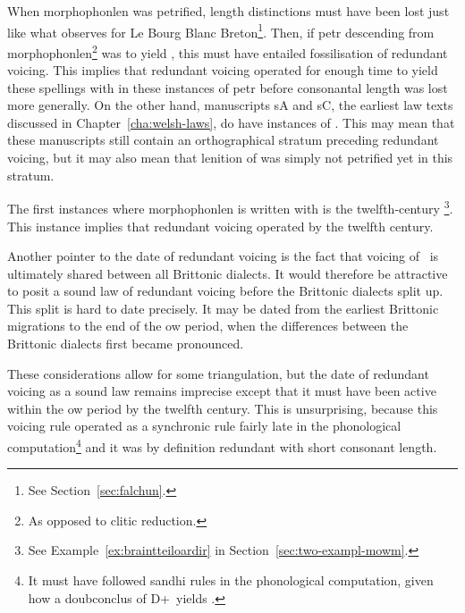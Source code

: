 When \gls{morphophonlen} was petrified, length distinctions must have been lost just like what \textcite{falchun_systeme_1951} observes for Le Bourg Blanc Breton\footnote{See Section~\ref{sec:falchun}.}. Then, if \gls{petr} descending from \gls{morphophonlen}\footnote{As opposed to clitic reduction.} was to yield , this must have entailed fossilisation of redundant voicing. This implies that redundant voicing operated for enough time to yield these spellings with  in these instances of \gls{petr} before consonantal length was lost more generally. On the other hand, manuscripts \gls{sA} and \gls{sC}, the earliest law texts discussed in Chapter~\ref{cha:welsh-laws}, do have instances of . This may mean that these manuscripts still contain an orthographical stratum preceding redundant voicing, but it may also mean that lenition of  was simply not petrified yet in this stratum.

The first instances where \gls{morphophonlen} is written with  is the twelfth-century \footnote{See Example~\ref{ex:braintteiloardir} in Section~\ref{sec:two-exampl-mowm}.}. This instance implies that redundant voicing operated by the twelfth century.  

Another pointer to the date of redundant voicing is the fact that voicing of \lT\ is ultimately shared between all Brittonic dialects. It would therefore be attractive to posit a sound law of redundant voicing before the Brittonic dialects split up. This split is hard to date precisely. It may be dated from the earliest Brittonic migrations to the end of the \gls{ow} period, when the differences between the Brittonic dialects first became pronounced.

These considerations allow for some triangulation, but the date of redundant voicing as a sound law remains imprecise except that it must have been active within the \gls{ow} period  by the twelfth century. This is  unsurprising, because this voicing rule operated as a synchronic rule fairly late in the phonological computation\footnote{It must have followed sandhi rules in the phonological computation, given how a \gls{doubconclus} of \gls{D}+\lT\ yields \xT.} and it was by definition redundant with short consonant length.

